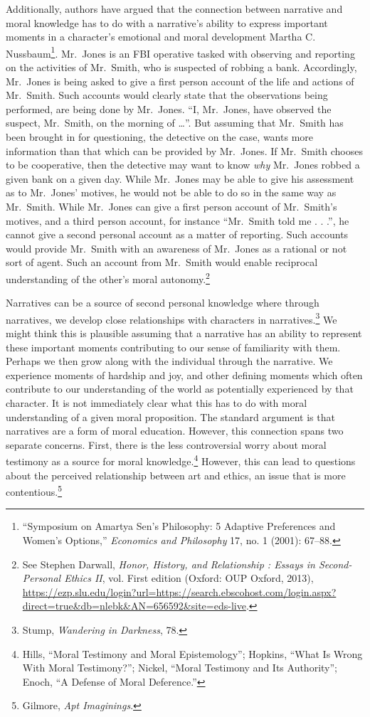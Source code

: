 \documentclass[phdthesis,12pt,final,a4paper]{wuthesis}
\theoremstyle{definition}
\theoremstyle{definition}
\theoremstyle{definition}
\theoremstyle{definition}
\theoremstyle{remark}
\begin{document}
Additionally, authors have argued that the connection between narrative and moral knowledge has to do with a narrative's ability to express important moments in a character's emotional and moral development Martha C. Nussbaum\footnote{{``Symposium on {Amartya Sen}'s Philosophy: 5 Adaptive Preferences and Women's Options,''} \emph{Economics and Philosophy} 17, no. 1 (2001): 67--88.}. Mr.~Jones is an FBI operative tasked with observing and reporting on the activities of Mr.~Smith, who is suspected of robbing a bank. Accordingly, Mr.~Jones is being asked to give a first person account of the life and actions of Mr.~Smith. Such accounts would clearly state that the observations being performed, are being done by Mr.~Jones. ``I, Mr.~Jones, have observed the suspect, Mr.~Smith, on the morning of \ldots{}''. But assuming that Mr.~Smith has been brought in for questioning, the detective on the case, wants more information than that which can be provided by Mr.~Jones. If Mr.~Smith chooses to be cooperative, then the detective may want to know \emph{why} Mr.~Jones robbed a given bank on a given day. While Mr.~Jones may be able to give his assessment as to Mr.~Jones' motives, he would not be able to do so in the same way as Mr.~Smith. While Mr.~Jones can give a first person account of Mr.~Smith's motives, and a third person account, for instance ``Mr.~Smith told me . . .'', he cannot give a second personal account as a matter of reporting. Such accounts would provide Mr.~Smith with an awareness of Mr.~Jones as a rational or not sort of agent. Such an account from Mr.~Smith would enable reciprocal understanding of the other's moral autonomy.\footnote{See Stephen Darwall, \emph{Honor, {History}, and {Relationship} : {Essays} in {Second-Personal Ethics II}}, vol. First edition (Oxford: OUP Oxford, 2013), \url{https://ezp.slu.edu/login?url=https://search.ebscohost.com/login.aspx?direct=true&db=nlebk&AN=656592&site=eds-live}.}

Narratives can be a source of second personal knowledge where through narratives, we develop close relationships with characters in narratives.\footnote{Stump, \emph{Wandering in {Darkness}}, 78.} We might think this is plausible assuming that a narrative has an ability to represent these important moments contributing to our sense of familiarity with them. Perhaps we then grow along with the individual through the narrative. We experience moments of hardship and joy, and other defining moments which often contribute to our understanding of the world as potentially experienced by that character. It is not immediately clear what this has to do with moral understanding of a given moral proposition. The standard argument is that narratives are a form of moral education. However, this connection spans two separate concerns. First, there is the less controversial worry about moral testimony as a source for moral knowledge.\footnote{Hills, {``Moral Testimony and Moral Epistemology''}; Hopkins, {``What {Is Wrong With Moral Testimony}?''}; Nickel, {``Moral {Testimony} and Its {Authority}''}; Enoch, {``A {Defense} of {Moral Deference}.''}} However, this can lead to questions about the perceived relationship between art and ethics, an issue that is more contentious.\footnote{Gilmore, \emph{Apt {Imaginings}}.}
\end{document}
